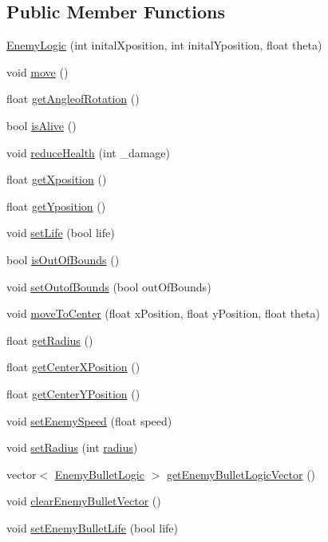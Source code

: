 \subsection*{Public Member Functions}
\begin{DoxyCompactItemize}
\item 
\hyperlink{class_enemy_logic_a6b405895fa7556810b8002b0d276d6cc}{Enemy\+Logic} (int inital\+Xposition, int inital\+Yposition, float theta)
\item 
void \hyperlink{class_enemy_logic_a2bc8ba642d677ab31f4b54ec00299e25}{move} ()
\item 
float \hyperlink{class_enemy_logic_ade03be41505c71de49f20fc855c8fede}{get\+Angleof\+Rotation} ()
\item 
bool \hyperlink{class_enemy_logic_a8dd48fa112c41249e46728d7ec8f820e}{is\+Alive} ()
\item 
void \hyperlink{class_enemy_logic_aaf2f8ff785c8f7410e04cfb3cb192b9b}{reduce\+Health} (int \+\_\+damage)
\item 
float \hyperlink{class_enemy_logic_a7eed969ab8e3d2527cdac04ef39a5aba}{get\+Xposition} ()
\item 
float \hyperlink{class_enemy_logic_ae614032054926a4a25ed56f61111392b}{get\+Yposition} ()
\item 
void \hyperlink{class_enemy_logic_a12bce0a6b6cad1af96aee3b401ea2c45}{set\+Life} (bool life)
\item 
bool \hyperlink{class_enemy_logic_a2e3e9e006259b36745beff4b55fd9bdc}{is\+Out\+Of\+Bounds} ()
\item 
void \hyperlink{class_enemy_logic_a0ac79ee7c0acf99b27aa4e22f98ce2d1}{set\+Outof\+Bounds} (bool out\+Of\+Bounds)
\item 
void \hyperlink{class_enemy_logic_a560cc578db8a77f250b63a111f51125e}{move\+To\+Center} (float x\+Position, float y\+Position, float theta)
\item 
float \hyperlink{class_enemy_logic_ab6736c870e69bc20bef8d6d010946eb2}{get\+Radius} ()
\item 
float \hyperlink{class_enemy_logic_a1429e91a81da7646d9b0280f26519d8c}{get\+Center\+X\+Position} ()
\item 
float \hyperlink{class_enemy_logic_a8eb47a87a47288783e0c8963c39d24e4}{get\+Center\+Y\+Position} ()
\item 
void \hyperlink{class_enemy_logic_aae66ecc1d28feaef7c814a0dff7eed95}{set\+Enemy\+Speed} (float speed)
\item 
void \hyperlink{class_enemy_logic_acabb2cb226edc71300ba1f2bc3e7a577}{set\+Radius} (int \hyperlink{_game_common_data_8h_a7a0b0f33d1d3a820325a517a0d840748}{radius})
\item 
vector$<$ \hyperlink{class_enemy_bullet_logic}{Enemy\+Bullet\+Logic} $>$ \hyperlink{class_enemy_logic_ae4e49b9f854bc0407510de8e3824c7c4}{get\+Enemy\+Bullet\+Logic\+Vector} ()
\item 
void \hyperlink{class_enemy_logic_af85aebe59b9cdee37bdab690fa496348}{clear\+Enemy\+Bullet\+Vector} ()
\item 
void \hyperlink{class_enemy_logic_a88584f95e49bfd6b174b9b1d9a274cc5}{set\+Enemy\+Bullet\+Life} (bool life)
\end{DoxyCompactItemize}


